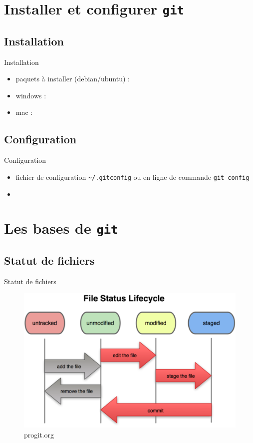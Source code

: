 \documentclass{beamer}
\newcommand{\git}{\texttt{git}}
\begin{document}
\section{Installer et configurer \git}

\subsection*{Installation}
\begin{frame}{Installation}
  \begin{itemize}
  \item paquets à installer (debian/ubuntu) :
  \item windows :
  \item mac :
  \end{itemize}
\end{frame}

\subsection*{Configuration}
\begin{frame}[containsverbatim]{Configuration}
  \begin{itemize}
  \item fichier de configuration \lstinline|~/.gitconfig| ou en ligne de commande \lstinline|git config|
  \item
  \end{itemize}
\end{frame}

\section{Les bases de \git}
\subsection*{Statut de fichiers}
\begin{frame}{Statut de fichiers}
  \begin{figure}
    \begin{center}
      \includegraphics[scale=0.7]{img/Status_lifecycle.png}
    \end{center}
    \caption{progit.org}
  \end{figure}
\end{frame}
\end{document}
